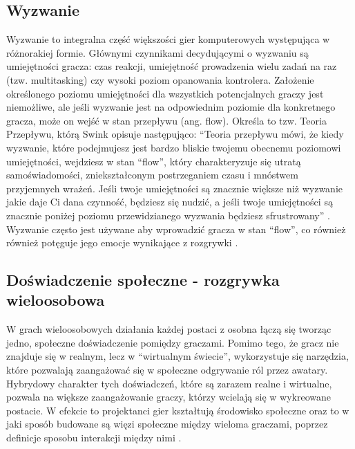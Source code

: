 


\subsection{Wyzwanie}

Wyzwanie to integralna część większości gier komputerowych występująca w różnorakiej formie. Głównymi czynnikami decydującymi o wyzwaniu są umiejętności gracza: czas reakcji, umiejętność prowadzenia wielu zadań na raz (tzw. multitasking) czy wysoki poziom opanowania kontrolera. Założenie określonego poziomu umiejętności dla wszystkich potencjalnych graczy jest niemożliwe, ale jeśli wyzwanie jest na odpowiednim poziomie dla konkretnego gracza, może on wejść w stan przepływu (ang. flow). Określa to tzw. Teoria Przepływu, którą Swink opisuje następująco: 
``Teoria przepływu mówi, że kiedy wyzwanie, które podejmujesz jest bardzo bliskie twojemu obecnemu poziomowi umiejętności, wejdziesz w stan ``flow'', który charakteryzuje się utratą samoświadomości,  zniekształconym postrzeganiem czasu i mnóstwem przyjemnych wrażeń. Jeśli twoje umiejętności są znacznie większe niż wyzwanie jakie daje Ci dana czynność, będziesz się nudzić, a jeśli twoje umiejętności są znacznie poniżej poziomu przewidzianego wyzwania będziesz sfrustrowany'' \citep[s.~23]{gamefeel}. Wyzwanie często jest używane aby wprowadzić gracza w stan ``flow'', co również  również potęguje jego emocje wynikające z rozgrywki \citep{button, gamefeel}.

\subsection{Doświadczenie społeczne - rozgrywka wieloosobowa}

W grach wieloosobowych działania każdej postaci z osobna łączą się tworząc jedno, społeczne doświadczenie pomiędzy graczami. Pomimo tego, że gracz nie znajduje się w realnym, lecz w ``wirtualnym świecie'', wykorzystuje się narzędzia, które pozwalają zaangażować się w społeczne odgrywanie ról przez awatary. Hybrydowy charakter tych doświadczeń, które są zarazem realne i wirtualne, pozwala na większe zaangażowanie graczy, którzy wcielają się w wykreowane postacie. W efekcie to projektanci gier kształtują środowisko społeczne oraz to w jaki sposób budowane są więzi społeczne między wieloma graczami, poprzez definicje sposobu interakcji między nimi \citep{movesus}.

